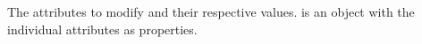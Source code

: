 The attributes to modify and their respective values.  
is an object with the individual attributes as properties.

